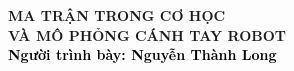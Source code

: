 \begin{frame}[noframenumbering]
    \thispagestyle{empty}
    \bfseries
    \begin{flushleft}
        \vfill
        \vspace{5mm}
        \textcolor{BlueDefault}{\huge \bfseries MA TRẬN TRONG CƠ HỌC \vspace{2mm} \\ VÀ MÔ PHỎNG CÁNH TAY ROBOT} \\
        \vspace{10mm}
        \textcolor{black}{\large \bfseries Người trình bày: Nguyễn Thành Long}
        \vfill
    \end{flushleft}
\end{frame}